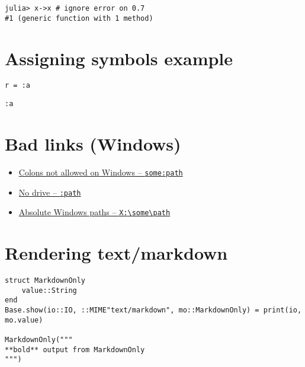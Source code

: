 \label{14560696320878109942}{}



\begin{lstlisting}[]
julia> x->x # ignore error on 0.7
#1 (generic function with 1 method)
\end{lstlisting}



\chapter{Assigning symbols example}



\label{2704106513432579326}{}



\begin{lstlisting}[]
r = :a
\end{lstlisting}


\begin{lstlisting}[]
:a
\end{lstlisting}



\chapter{Bad links (Windows)}



\label{4891343357159032293}{}


\begin{itemize}
\item \href{some:path}{Colons not allowed on Windows – \texttt{some:path}}


\item \href{:path}{No {\textquotedbl}drive{\textquotedbl} – \texttt{:path}}


\item \href{X:{\textbackslash}some{\textbackslash}path}{Absolute Windows paths – \texttt{X:{\textbackslash}some{\textbackslash}path}}

\end{itemize}


\chapter{Rendering text/markdown}



\label{6848322038670609146}{}



\begin{lstlisting}[]
struct MarkdownOnly
    value::String
end
Base.show(io::IO, ::MIME"text/markdown", mo::MarkdownOnly) = print(io, mo.value)

MarkdownOnly("""
**bold** output from MarkdownOnly
""")
\end{lstlisting}

